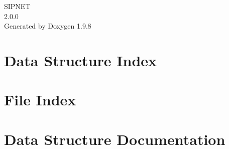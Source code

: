 \documentclass[twoside]{book}
\newcommand{\+}{\discretionary{\mbox{\scriptsize$\hookleftarrow$}}{}{}}
\newcommand{\clearemptydoublepage}{%
    \newpage{\pagestyle{empty}\cleardoublepage}%
  }
\begin{document}
  \raggedbottom
  \begin{titlepage}
  \vspace*{7cm}
  \begin{center}%
  {\Large SIPNET}\\
  [1ex]\large 2.\+0.\+0 \\
  \vspace*{1cm}
  {\large Generated by Doxygen 1.9.8}\\
  \end{center}
  \end{titlepage}
  \clearemptydoublepage
  \tableofcontents
  \clearemptydoublepage

\chapter{Data Structure Index}

\chapter{File Index}

\chapter{Data Structure Documentation}






















\end{document}
